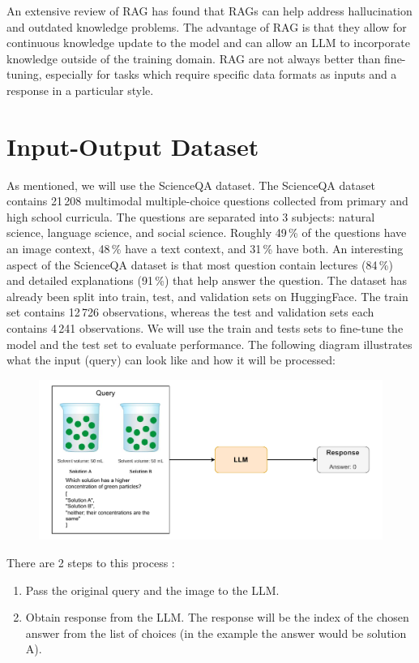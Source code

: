 \documentclass[11pt]{article} %
\begin{document}
An extensive review of RAG \cite{ragreview} has found that RAGs can help address hallucination and outdated knowledge problems. The advantage of RAG is that they allow for continuous knowledge update to the model and can allow an LLM to incorporate knowledge outside of the training domain. RAG are not always better than fine-tuning, especially for tasks which require specific data formats as inputs and a response in a particular style.

\section*{Input-Output Dataset}
As mentioned, we will use the ScienceQA dataset. The ScienceQA dataset contains 21\,208 multimodal multiple-choice questions collected from primary and high school curricula. The questions are separated into 3 subjects: natural science, language science, and social science. Roughly 49\,\% of the questions have an image context, 48\,\% have a text context, and 31\,\% have both. An interesting aspect of the ScienceQA dataset is that most question contain lectures (84\,\%) and detailed explanations (91\,\%) that help answer the question. The dataset has already been split into train, test, and validation sets on HuggingFace. The train set contains 12\,726 observations, whereas the test and validation sets each contains 4\,241 observations. We will use the train and tests sets to fine-tune the model and the test set to evaluate performance. The following diagram illustrates what the input (query) can look like and how it will be processed: 

\begin{figure}[H]
    \centering
    \includegraphics[scale=0.7]{llm_diagram.pdf}
\end{figure}

There are 2 steps to this process :
\begin{enumerate}
    \item Pass the original query and the image to the LLM.
    \item Obtain response from the LLM. The response will be the index of the chosen answer from the list of choices (in the example the answer would be solution A).
\end{enumerate}
\end{document}

